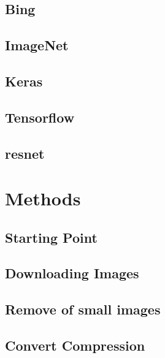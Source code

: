 \documentclass{scrartcl}
\begin{document}
		\subsection{Bing}
		\label{chap:bing}
		

		\subsection{ImageNet}
		\label{chap:imagenet}
		

		\subsection{Keras}
		\label{chap:keras}
		

		\subsection{Tensorflow}
		\label{chap:tensorflow}
		
	
		\subsection{\ac{resnet}}
		\label{chap:resnet}
		

	\newpage
	\section{Methods}
	\label{chap:methods}

		\subsection{Starting Point}
		\label{chap:starting-point}
		

		\subsection{Downloading Images}
		\label{chap:downloading-images}
		

		\clearpage
		\subsection{Remove of small images}
		\label{chap:remove-of-small-images}
		

		\subsection{Convert Compression}
		\label{chap:convert-compression}
		
\end{document}
